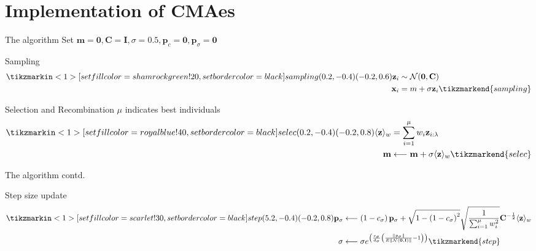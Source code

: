 \documentclass[presentation]{beamer}
\begin{document}
\section{Implementation of CMAes}
\label{sec:org10c7cd3}
\begin{frame}[label={sec:org682ca67}]{The algorithm}
Set \(\mathbf{m} = \mathbf{0}, \mathbf{C} = \mathbf{I}, \sigma =
 0.5, \mathbf{p}_c = \mathbf{0}, \mathbf{p}_{\sigma} = \mathbf{0}\)
\begin{block}{Sampling}
\[ \begin{aligned}
	  \tikzmarkin<1>[set fill color=shamrockgreen!20, set border color=black]{sampling}(0.2,-0.4)(-0.2,0.6)
	  \mathbf{z}_{i} & \sim \mathcal{N}(\mathbf{0}, \mathbf{C}) \\
	  \mathbf{x}_{i} &= m+\sigma \mathbf{z}_{i} \tikzmarkend{sampling}
	  \end{aligned} \]
\end{block}

\begin{block}{Selection and Recombination}
\(\mu\) indicates best individuals
  \[ \begin{aligned}
	  \tikzmarkin<1>[set fill color=royalblue!40, set border color=black]{selec}(0.2,-0.4)(-0.2,0.8)
	  \langle\mathbf{z}\rangle_{w} &= \sum_{i=1}^{\mu} w_{i} \mathbf{z}_{i : \lambda} \\
	  \mathbf{m} &\longleftarrow \mathbf{m}+\sigma\langle\mathbf{z}\rangle_{w} \tikzmarkend{selec}
	  \end{aligned} \]
\end{block}
\end{frame}

\begin{frame}[label={sec:orgc5fc785}]{The algorithm contd.}
\begin{block}{Step size update}
\[ \begin{aligned}
	 \tikzmarkin<1>[set fill color=scarlet!30, set border color=black]{step}(5.2,-0.4)(-0.2,0.8)
	 \mathbf{p}_{\sigma} &\longleftarrow\left(1-c_{\sigma}\right)
	 \mathbf{p}_{\sigma}+\sqrt{1-\left(1-c_{\sigma}\right)^{2}}
	 \sqrt{\frac{1}{\sum_{i=1}^{\mu} w_{i}^{2}}}
	 \mathbf{C}^{-\frac{1}{2}}\langle\mathbf{z}\rangle_{w} \\
	 \sigma &\longleftarrow \sigma
	 e^{\left(\frac{c_\sigma}{d_{\sigma}}\left(\frac{\left\|p_{\sigma}\right\|}{E\|\mathcal{N}(\mathbf{0},
	 \mathbf{I})\|}-1\right)\right)} \tikzmarkend{step}
	 \end{aligned} \]
\end{block}
\end{frame}
\end{document}
